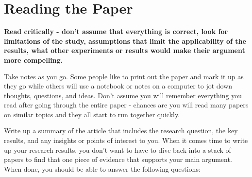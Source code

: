 \documentclass[12pt, letterpaper]{article}
\begin{document}
\section{Reading the Paper}

\textbf{Read critically - don't assume that everything is correct, look for limitations of the study, assumptions that limit the applicability of the results, what other experiments or results would make their argument more compelling.}

Take notes as you go.  Some people like to print out the paper and mark it up as they go while others will use a notebook or notes on a computer to jot down thoughts, questions, and ideas.  Don't assume you will remember everything you read after going through the entire paper - chances are you will read many papers on similar topics and they all start to run together quickly.

Write up a summary of the article that includes the research question, the key results, and any insights or points of interest to you.  When it comes time to write up your research results, you don't want to have to dive back into a stack of papers to find that one piece of evidence that supports your main argument.  When done, you should be able to answer the following questions:
\end{document}
